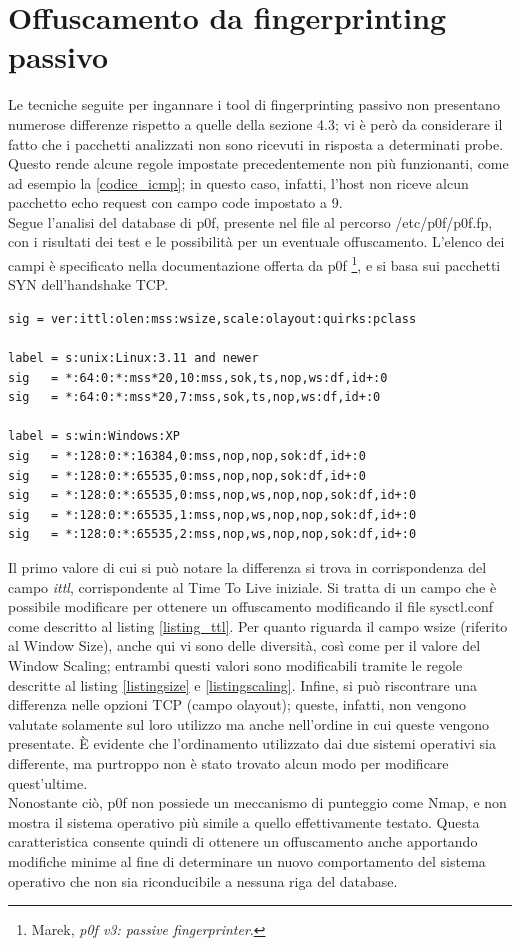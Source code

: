 \section{Offuscamento da fingerprinting passivo}
Le tecniche seguite per ingannare i tool di fingerprinting passivo non presentano numerose differenze rispetto a quelle della sezione 4.3; vi è però da considerare il fatto che i pacchetti analizzati non sono ricevuti in risposta a determinati probe.
Questo rende alcune regole impostate precedentemente non più funzionanti, come ad esempio la \ref{codice_icmp}; in questo caso, infatti, l'host non riceve alcun pacchetto echo request con campo code impostato a 9.
\\
Segue l'analisi del database di p0f, presente nel file al percorso /etc/p0f/p0f.fp, con i risultati dei test e le possibilità per un eventuale offuscamento. L'elenco dei campi è specificato nella documentazione offerta da p0f \footnote{Marek, \textit{p0f v3: passive fingerprinter}.}, e si basa sui pacchetti SYN dell'handshake TCP. 
\begin{lstlisting}[caption={Fingerptinting TCP con p0f}]
sig = ver:ittl:olen:mss:wsize,scale:olayout:quirks:pclass

label = s:unix:Linux:3.11 and newer
sig   = *:64:0:*:mss*20,10:mss,sok,ts,nop,ws:df,id+:0
sig   = *:64:0:*:mss*20,7:mss,sok,ts,nop,ws:df,id+:0

label = s:win:Windows:XP
sig   = *:128:0:*:16384,0:mss,nop,nop,sok:df,id+:0
sig   = *:128:0:*:65535,0:mss,nop,nop,sok:df,id+:0
sig   = *:128:0:*:65535,0:mss,nop,ws,nop,nop,sok:df,id+:0
sig   = *:128:0:*:65535,1:mss,nop,ws,nop,nop,sok:df,id+:0
sig   = *:128:0:*:65535,2:mss,nop,ws,nop,nop,sok:df,id+:0
\end{lstlisting}

Il primo valore di cui si può notare la differenza si trova in corrispondenza del campo \textit{ittl}, corrispondente al Time To Live iniziale.
Si tratta di un campo che è possibile modificare per ottenere un offuscamento modificando il file sysctl.conf come descritto al listing \ref{listing_ttl}.
Per quanto riguarda il campo wsize (riferito al Window Size), anche qui vi sono delle diversità, così come per il valore del Window Scaling; entrambi questi valori sono modificabili tramite le regole descritte al listing \ref{listingsize} e \ref{listingscaling}.
Infine, si può riscontrare una differenza nelle opzioni TCP (campo olayout); queste, infatti, non vengono valutate solamente sul loro utilizzo ma anche nell'ordine in cui queste vengono presentate. È evidente che l'ordinamento utilizzato dai due sistemi operativi sia differente, ma purtroppo non è stato trovato alcun modo per modificare quest'ultime.\\
Nonostante ciò, p0f non possiede un meccanismo di punteggio come Nmap, e non mostra il sistema operativo più simile a quello effettivamente testato. Questa caratteristica consente quindi di ottenere un offuscamento anche apportando modifiche minime al fine di determinare un nuovo comportamento del sistema operativo che non sia riconducibile a nessuna riga del database.

